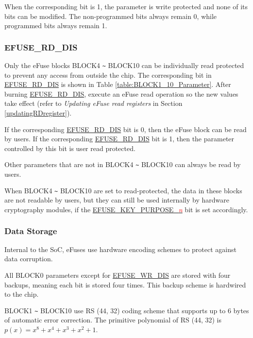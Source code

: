 \documentclass[main\_\_EN.tex]{subfiles}
\begin{document}
When the corresponding bit is 1, the parameter is write protected and none of its bits can be modified. The non-programmed bits always remain 0, while programmed bits always remain 1.

\subsubsection{EFUSE\_RD\_DIS}\label{section:EFUSERDDISABLE}

Only the eFuse blocks BLOCK4 \verb+~+ BLOCK10 can be individually read protected to prevent any access from outside the chip. The corresponding bit in \hyperref[fielddesc:EFUSERDDIS]{EFUSE\_RD\_DIS} is shown in Table  \ref{table:BLOCK1_10_Parameter}. After burning \hyperref[fielddesc:EFUSERDDIS]{EFUSE\_RD\_DIS}, execute an eFuse read operation so the new values take effect (refer to \textit{Updating eFuse read registers} in Section \ref{updatingRDregister}).

If the corresponding \hyperref[fielddesc:EFUSERDDIS]{EFUSE\_RD\_DIS} bit is 0, then the eFuse block can be read by users. If the corresponding \hyperref[fielddesc:EFUSERDDIS]{EFUSE\_RD\_DIS} bit is 1, then the parameter controlled by this bit is user read protected.

Other parameters that are not in BLOCK4 \verb+~+ BLOCK10 can always be read by users.

When BLOCK4 \verb+~+ BLOCK10 are set to read-protected, the data in these blocks are not readable by users, but they can still be used internally by hardware cryptography modules, if the \hyperref[fielddesc:EFUSEKEYPURPOSE3]{EFUSE\_KEY\_PURPOSE\_\textcolor{red}{\it{n}}} bit is set accordingly.


\subsubsection{Data Storage}\label{datastorage}

Internal to the SoC, eFuses use hardware encoding schemes to protect against data corruption.

All BLOCK0 parameters except for \hyperref[fielddesc:EFUSEWRDIS]{EFUSE\_WR\_DIS} are stored with four backups, meaning each bit is stored four times. This backup scheme is hardwired to the chip.

BLOCK1 \verb+~+ BLOCK10 use RS (44, 32) coding scheme that supports up to 6 bytes of automatic error correction. The primitive polynomial of RS (44, 32) is \(p(x)=x^8+x^4+x^3+x^2+1\).
\end{document}
